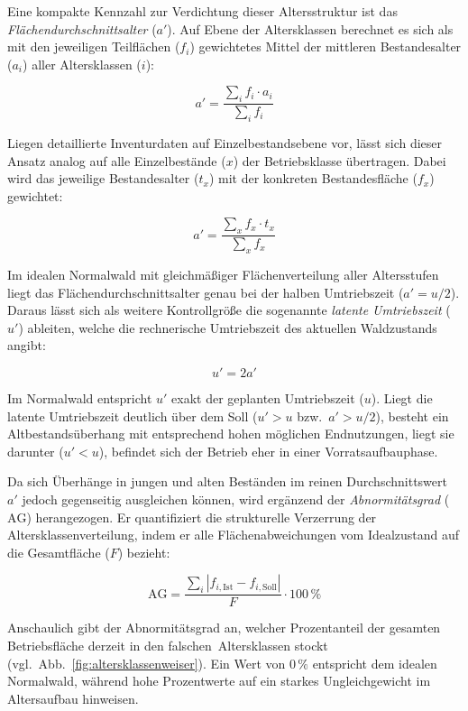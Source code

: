 \documentclass[twocolumn, paper=a4, fontsize=10pt]{scrartcl}
\begin{document}
Eine kompakte Kennzahl zur Verdichtung dieser Altersstruktur ist das \emph{Flächendurchschnittsalter} ($a'$). Auf Ebene der Altersklassen berechnet es sich als mit den jeweiligen Teilflächen ($f_i$) gewichtetes Mittel der mittleren Bestandesalter ($a_i$) aller Altersklassen ($i$):

\begin{equation}
  a' = \frac{\sum_{i} f_i \cdot a_i}{\sum_{i} f_i}
\end{equation}

Liegen detaillierte Inventurdaten auf Einzelbestandsebene vor, lässt sich dieser Ansatz analog auf alle Einzelbestände ($x$) der Betriebsklasse übertragen. Dabei wird das jeweilige Bestandesalter ($t_x$) mit der konkreten Bestandesfläche ($f_x$) gewichtet:

\begin{equation}
  a' = \frac{\sum_{x} f_x \cdot t_x}{\sum_{x} f_x}
\end{equation}

Im idealen Normalwald mit gleichmäßiger Flächenverteilung aller Altersstufen liegt das Flächendurchschnittsalter genau bei der halben Umtriebszeit ($a' = u/2$). Daraus lässt sich als weitere Kontrollgröße die sogenannte \emph{latente Umtriebszeit} ($u'$) ableiten, welche die rechnerische Umtriebszeit des aktuellen Waldzustands angibt:

\begin{equation}
    u' = 2a'
\end{equation}

Im Normalwald entspricht $u'$ exakt der geplanten Umtriebszeit ($u$). Liegt die latente Umtriebszeit deutlich über dem Soll ($u' > u$ bzw.\ $a' > u/2$), besteht ein Altbestandsüberhang mit entsprechend hohen möglichen Endnutzungen, liegt sie darunter ($u' < u$), befindet sich der Betrieb eher in einer Vorratsaufbauphase.

Da sich Überhänge in jungen und alten Beständen im reinen Durchschnittswert $a'$ jedoch gegenseitig ausgleichen können, wird ergänzend der \emph{Abnormitätsgrad} ($\text{AG}$) herangezogen. Er quantifiziert die strukturelle Verzerrung der Altersklassenverteilung, indem er alle Flächenabweichungen vom Idealzustand auf die Gesamtfläche ($F$) bezieht:

\begin{equation}
    \text{AG} = \frac{\sum_{i} |f_{i,\text{Ist}} - f_{i,\text{Soll}}|}{F} \cdot 100\,\%
\end{equation}

Anschaulich gibt der Abnormitätsgrad an, welcher Prozentanteil der gesamten Betriebsfläche derzeit in den \glqq falschen\grqq\ Altersklassen stockt (vgl.\ Abb.~\ref{fig:altersklassenweiser}). Ein Wert von $0\,\%$ entspricht dem idealen Normalwald, während hohe Prozentwerte auf ein starkes Ungleichgewicht im Altersaufbau hinweisen.
\end{document}

